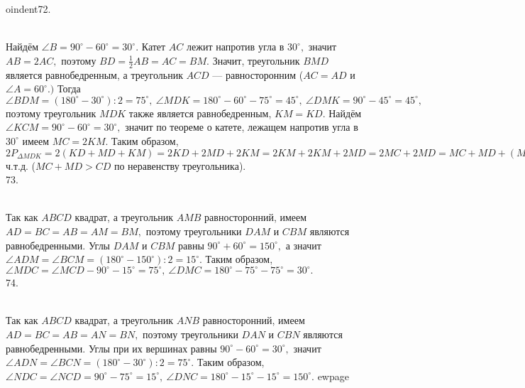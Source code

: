 oindent72. \begin{figure}[ht!]
\end{figure}\\
Найдём $\angle B=90^\circ-60^\circ=30^\circ.$ Катет $AC$ лежит напротив угла в $30^\circ,$ значит $AB=2AC,$ поэтому $BD=\frac{1}{2}AB=AC=BM.$ Значит, треугольник $BMD$ является равнобедренным, а треугольник $ACD$ --- равносторонним ($AC=AD$ и $\angle A=60^\circ.)$ Тогда $\angle BDM=(180^\circ-30^\circ):2=75^\circ,\ \angle MDK=180^\circ-60^\circ-75^\circ=45^\circ,\ \angle DMK=90^\circ-45^\circ=45^\circ,$ поэтому треугольник $MDK$ также является равнобедренным, $KM=KD.$ Найдём $\angle KCM=90^\circ-60^\circ=30^\circ,$ значит по теореме о катете, лежащем напротив угла в $30^\circ$ имеем $MC=2KM.$ Таким образом, $2P_{\Delta MDK}=2(KD+MD+KM)=
2KD+2MD+2KM=2KM+2KM+2MD=2MC+2MD=MC+MD+(MC+MD)>MC+MD+CD=P_{\Delta DMC},$ ч.т.д. ($MC+MD>CD$ по неравенству треугольника).\\
73. \begin{figure}[ht!]
\end{figure}\\
Так как $ABCD$ квадрат, а треугольник $AMB$ равносторонний, имеем $AD=BC=AB=AM=BM,$ поэтому треугольники $DAM$ и $CBM$ являются равнобедренными. Углы $DAM$ и $CBM$ равны $90^\circ+60^\circ=150^\circ,$ а значит $\angle ADM=\angle BCM=(180^\circ-150^\circ):2=15^\circ.$ Таким образом, $\angle MDC=\angle MCD-90^\circ-15^\circ=75^\circ,\ \angle DMC=180^\circ-75^\circ-75^\circ=30^\circ.$\\
74.  \begin{figure}[ht!]
\end{figure}\\
Так как $ABCD$ квадрат, а треугольник $ANB$ равносторонний, имеем $AD=BC=AB=AN=BN,$ поэтому треугольники $DAN$ и $CBN$ являются равнобедренными. Углы при их вершинах равны $90^\circ-60^\circ=30^\circ,$ значит $\angle ADN=\angle BCN=(180^\circ-30^\circ):2=75^\circ.$ Таким образом, $\angle NDC=\angle NCD=90^\circ-75^\circ=15^\circ,\ \angle DNC=180^\circ-15^\circ-15^\circ=150^\circ.$
ewpage

